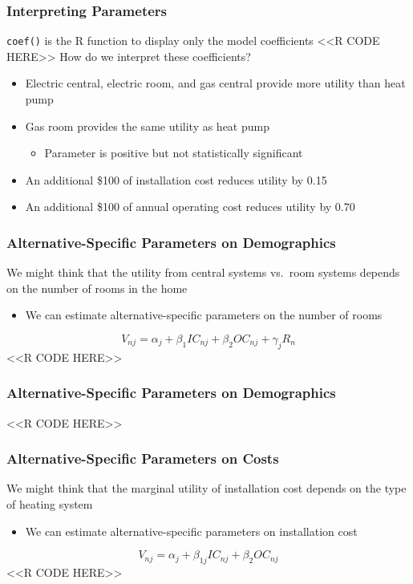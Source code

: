 \documentclass{beamer}
\begin{document}
\begin{frame}[fragile]\frametitle{Interpreting Parameters}
    \texttt{coef()} is the R function to display only the model coefficients
    <<R CODE HERE>>
    \vspace{2ex}
    How do we interpret these coefficients?
    \begin{itemize}
        \item Electric central, electric room, and gas central provide more utility than heat pump
        \item Gas room provides the same utility as heat pump
        \begin{itemize}
        	\item Parameter is positive but not statistically significant
        \end{itemize}
        \item An additional \$100 of installation cost reduces utility by 0.15
        \item An additional \$100 of annual operating cost reduces utility by 0.70
    \end{itemize}
\end{frame}

\begin{frame}[fragile]\frametitle{Alternative-Specific Parameters on Demographics}
	We might think that the utility from central systems vs.\ room systems depends on the number of rooms in the home
	\begin{itemize}
		\item We can estimate alternative-specific parameters on the number of rooms
	\end{itemize}
    $$V_{nj} = \alpha_j + \beta_1 IC_{nj} + \beta_2 OC_{nj} + \gamma_j R_{n}$$
    <<R CODE HERE>>
\end{frame}

\begin{frame}[fragile]\frametitle{Alternative-Specific Parameters on Demographics}
    \vspace{1ex}
    <<R CODE HERE>>
\end{frame}

\begin{frame}[fragile]\frametitle{Alternative-Specific Parameters on Costs}
	We might think that the marginal utility of installation cost depends on the type of heating system
	\begin{itemize}
		\item We can estimate alternative-specific parameters on installation cost
	\end{itemize}
    $$V_{nj} = \alpha_j + \beta_{1j} IC_{nj} + \beta_2 OC_{nj}$$
    <<R CODE HERE>>
\end{frame}
\end{document}
